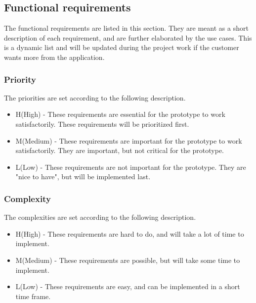 \subsection{Functional requirements}
The functional requirements are listed in this section.
They are meant as a short description of each requirement,
and are further elaborated by the use cases.
This is a dynamic list and will be updated during the project work if the customer wants more from the application.

\subsubsection{Priority}
The priorities are set according to the following description.
\begin{itemize}
	 \item H(High) - These requirements are essential for the prototype to work satisfactorily. These requirements will be prioritized first.
	\item M(Medium) - These requirements are important for the prototype to work satisfactorily. They are important, but not critical for the prototype.
	\item L(Low) - These requirements are not important for the prototype. They are "nice to have", but will be implemented last.
\end{itemize}

\subsubsection{Complexity}
The complexities are set according to the following description.
\begin{itemize}
	\item H(High) - These requirements are hard to do, and will take a lot of time to implement.
	\item M(Medium) - These requirements are possible, but will take some time to implement.
	\item L(Low) - These requirements are easy, and can be implemented in a short time frame.
\end{itemize}

